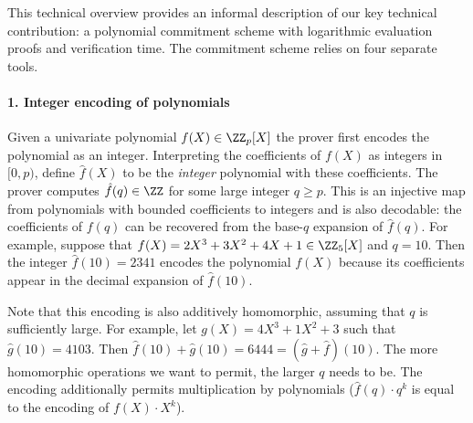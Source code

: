 This technical overview provides an informal description of our key technical contribution: a polynomial commitment scheme with logarithmic evaluation proofs and verification time.
The commitment scheme relies on four separate tools.
\paragraph{1. Integer encoding of polynomials}
Given a univariate polynomial $f(X)\in \ZZ_p[X]$ the prover first encodes the polynomial as an integer. Interpreting the coefficients of $f(X)$ as integers in
 $[0, p)$, define $\hat{f}(X)$ to be the \emph{integer} polynomial with these coefficients. The prover computes $\hat{f}(q)\in \ZZ$ for some large integer $q\geq p$. This is an injective map from polynomials with bounded coefficients to integers and is also decodable: the coefficients of $f(q)$ can be recovered from the base-$q$ expansion of $\hat{f}(q)$. For example, suppose that $f(X)=2X^3+3X^2+4X+1 \in \ZZ_5[X]$ and $q=10$. Then the integer $\hat{f}(10)=2341$ encodes the polynomial $f(X)$ because its coefficients appear in the decimal expansion of $\hat{f}(10)$.

Note that this encoding is also additively homomorphic, assuming that $q$ is sufficiently large. 
For example, let $g(X)=4X^3+1X^2+3$ such that $\hat{g}(10)=4103$. Then $\hat{f}(10)+\hat{g}(10)=6444=(\hat{g}+\hat{f})(10)$. 
The more homomorphic operations we want to permit, the larger $q$ needs to be.
The encoding additionally permits multiplication by polynomials ($\hat{f}(q)\cdot q^k$ is equal to the encoding of $f(X)\cdot X^k$). 
\begin{comment}
Or in our example $100 \cdot f(10)=234100$ which is the encoding of $2\cdot X^5+3\cdot X^4+4\cdot X^3+X^2$.
\end{comment}

